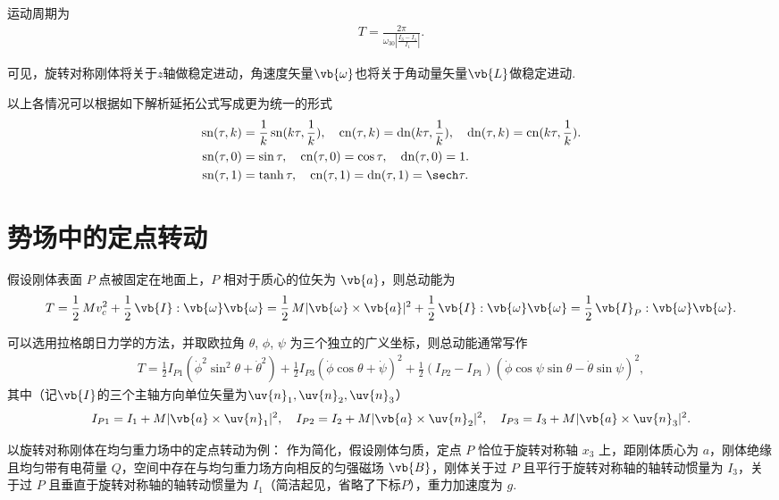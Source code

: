 运动周期为
\begin{align*}
	T = \frac{2\pi}{\omega_{30}\left|\frac{I_3-I_1}{I_1}\right|}.
\end{align*}

可见，旋转对称刚体将关于\(z\)轴做稳定进动，角速度矢量\(\vb{\omega}\)也将关于角动量矢量\(\vb{L}\)做稳定进动.

\begin{note}
	以上各情况可以根据如下解析延拓公式写成更为统一的形式
	\begin{align*}
		\sn(\tau,k)&=\frac{1}{k}\sn(k\tau,\frac{1}{k}),\quad \cn(\tau,k)=\dn(k\tau,\frac{1}{k}),\quad \dn(\tau,k)=\cn(k\tau,\frac{1}{k}).\\
		\sn(\tau,0)&=\sin\tau,\quad \cn(\tau,0)=\cos\tau,\quad \dn(\tau,0)=1.\\
		\sn(\tau,1)&=\tanh\tau,\quad \cn(\tau,1)=\dn(\tau,1)=\sech\tau.
	\end{align*}
\end{note}
\section{势场中的定点转动}
假设刚体表面 \(P\) 点被固定在地面上，\(P\) 相对于质心的位矢为 \(\vb{a}\)，则总动能为
\begin{align*}
	T= \frac{1}{2}\, M v_c^2 + \frac{1}{2}\, \vb{I} : \vb{\omega} \vb{\omega} = \frac{1}{2}\, M | \vb{\omega} \times \vb{a} |^2 + \frac{1}{2}\, \vb{I} : \vb{\omega} \vb{\omega} = \frac{1}{2}\, \vb{I}_P : \vb{\omega} \vb{\omega}.
\end{align*}

可以选用拉格朗日力学的方法，并取欧拉角 \(\theta\), \(\phi\), \(\psi\) 为三个独立的广义坐标，则总动能通常写作
\begin{align*}
	T = \frac{1}{2} I_{P1} (\dot{\phi}^2 \sin^2 \theta + \dot{\theta}^2) + \frac{1}{2} I_{P3} (\dot{\phi} \cos \theta + \dot{\psi})^2 + \frac{1}{2} (I_{P2} - I_{P1}) (\dot{\phi} \cos \psi \sin \theta - \dot{\theta} \sin \psi)^2,
\end{align*}
其中（记\(\vb{I}\)的三个主轴方向单位矢量为\(\uv{n}_1,\uv{n}_2,\uv{n}_3\)）
\begin{align*}
	I_{P1} = I_1 + M | \vb{a} \times \uv{n}_1 |^2,\quad I_{P2} = I_2 + M | \vb{a} \times \uv{n}_2 |^2, \quad I_{P3} =I_3 + M | \vb{a} \times \uv{n}_3 |^2.
\end{align*}

以旋转对称刚体在均匀重力场中的定点转动为例：
作为简化，假设刚体匀质，定点 \(P\) 恰位于旋转对称轴 \(x_3\) 上，距刚体质心为 \(a\)，刚体绝缘且均匀带有电荷量 \(Q\)，空间中存在与均匀重力场方向相反的匀强磁场 \(\vb{B}\)，刚体关于过 \(P\) 且平行于旋转对称轴的轴转动惯量为 \(I_3\)，关于过 \(P\) 且垂直于旋转对称轴的轴转动惯量为 \(I_1\)（简洁起见，省略了下标\(P\)），重力加速度为 \(g\).

